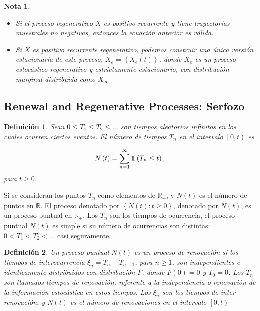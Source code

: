 \documentclass{article}
\newtheorem{Def}{Definición}
\newtheorem{Note}{Nota}
\newcommand{\rea}{\mathbb{R}}
\newcommand{\indora}{\mbox{$1$\hspace{-0.8ex}$1$}}
\begin{document}
\begin{Note}
\begin{itemize}
\item[a)] Si el proceso regenerativo $X$ es positivo recurrente y tiene trayectorias muestrales no negativas, entonces la ecuaci\'on anterior es v\'alida.
\item[b)] Si $X$ es positivo recurrente regenerativo, podemos construir una \'unica versi\'on estacionaria de este proceso, $X_{e}=\left\{X_{e}\left(t\right)\right\}$, donde $X_{e}$ es un proceso estoc\'astico regenerativo y estrictamente estacionario, con distribuci\'on marginal distribuida como $X_{\infty}$
\end{itemize}
\end{Note}

\subsection{Renewal and Regenerative Processes: Serfozo\cite{Serfozo}}
\begin{Def}\label{Def.Tn}
Sean $0\leq T_{1}\leq T_{2}\leq \ldots$ son tiempos aleatorios infinitos en los cuales ocurren ciertos eventos. El n\'umero de tiempos $T_{n}$ en el intervalo $\left[0,t\right)$ es

\begin{eqnarray}
N\left(t\right)=\sum_{n=1}^{\infty}\indora\left(T_{n}\leq t\right),
\end{eqnarray}
para $t\geq0$.
\end{Def}

Si se consideran los puntos $T_{n}$ como elementos de $\rea_{+}$, y $N\left(t\right)$ es el n\'umero de puntos en $\rea$. El proceso denotado por $\left\{N\left(t\right):t\geq0\right\}$, denotado por $N\left(t\right)$, es un proceso puntual en $\rea_{+}$. Los $T_{n}$ son los tiempos de ocurrencia, el proceso puntual $N\left(t\right)$ es simple si su n\'umero de ocurrencias son distintas: $0<T_{1}<T_{2}<\ldots$ casi seguramente.

\begin{Def}
Un proceso puntual $N\left(t\right)$ es un proceso de renovaci\'on si los tiempos de interocurrencia $\xi_{n}=T_{n}-T_{n-1}$, para $n\geq1$, son independientes e identicamente distribuidos con distribuci\'on $F$, donde $F\left(0\right)=0$ y $T_{0}=0$. Los $T_{n}$ son llamados tiempos de renovaci\'on, referente a la independencia o renovaci\'on de la informaci\'on estoc\'astica en estos tiempos. Los $\xi_{n}$ son los tiempos de inter-renovaci\'on, y $N\left(t\right)$ es el n\'umero de renovaciones en el intervalo $\left[0,t\right)$
\end{Def}
\end{document}
